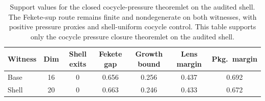 \begin{table}[t]
\caption{Support values for the closed cocycle-pressure theoremlet on the audited shell.
The Fekete-sup route remains finite and nondegenerate on both witnesses,
with positive pressure proxies and shell-uniform cocycle control.
This table supports only the cocycle pressure closure theoremlet
on the audited shell.}
\label{tbl:pressure-closure-support}
\centering
\small
\begin{tabular}{@{}l c c c c c c@{}}
\toprule
Witness & Dim & Shell exits & Fekete gap & Growth bound & Lens margin & Pkg.\ margin \\
\midrule
Base  & 16 & 0 & 0.656 & 0.256 & 0.437 & 0.692 \\
Shell & 20 & 0 & 0.663 & 0.246 & 0.433 & 0.672 \\
\bottomrule
\end{tabular}
\end{table}

